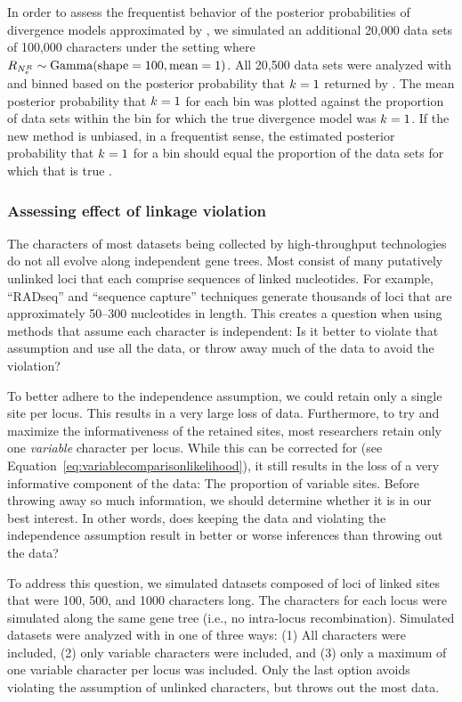 In order to assess the frequentist behavior of the posterior probabilities of
divergence models approximated by \ecoevolity, we simulated an additional
20,000 data sets of 100,000 characters under the setting where
$R_{N_{e}^{R{}}} \sim \textrm{Gamma}(\textrm{shape} = 100, \textrm{mean} = 1)$.
All 20,500 data sets were analyzed with \ecoevolity and binned based on the
posterior probability that $k_{} = 1$ returned by \ecoevolity.
The mean posterior probability that $k_{} = 1$ for each bin was plotted
against the proportion of data sets within the bin for which the true
divergence model was $k_{} = 1$.
If the new method is unbiased, in a frequentist sense, the estimated posterior
probability that $k_{} = 1$ for a bin should equal the proportion of the
data sets for which that is true \citep{Huelsenbeck2004,Oaks2012,Oaks2014dpp}.

\subsubsection{Assessing effect of linkage violation}
The characters of most datasets being collected by high-throughput technologies
do not all evolve along independent gene trees.
Most consist of many putatively unlinked loci that each comprise sequences of
linked nucleotides.
For example, ``RADseq'' and ``sequence capture'' techniques generate thousands
of loci that are approximately 50--300 nucleotides in length.
This creates a question when using methods that assume each character is
independent:
Is it better to violate that assumption and use all the data, or throw
away much of the data to avoid the violation?

To better adhere to the independence assumption, we could retain only a single
site per locus.
This results in a very large loss of data.
Furthermore, to try and maximize the informativeness of the retained sites,
most researchers retain only one \emph{variable} character per locus.
While this can be corrected for (see
Equation~\ref{eq:variablecomparisonlikelihood}), it still results in the loss
of a very informative component of the data: The proportion of variable sites.
Before throwing away so much information, we should determine whether
it is in our best interest.
In other words, does keeping the data and violating the independence
assumption result in better or worse inferences than throwing out the 
data?

To address this question, 
we simulated datasets composed of loci of linked sites that were 100, 500, and
1000 characters long.
The characters for each locus were simulated along the same gene tree (i.e., no
intra-locus recombination).
Simulated datasets were analyzed with \ecoevolity in one of three ways:
(1) All characters were included,
(2) only variable characters were included,
and
(3) only a maximum of one variable character per locus was included.
Only the last option avoids violating the assumption of unlinked characters,
but throws out the most data.

